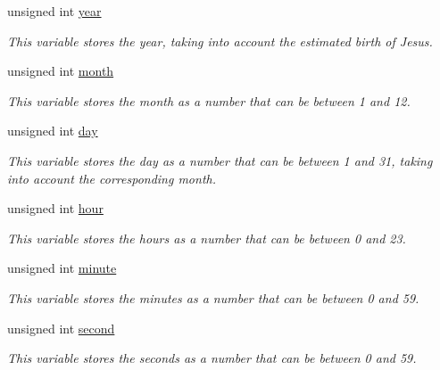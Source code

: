 \begin{DoxyCompactItemize}
\item 
\mbox{\label{structTimeData_a457ba435747cdc51aa3c9213dc75e916}} 
unsigned int \hyperlink{structTimeData_a457ba435747cdc51aa3c9213dc75e916}{year}
\begin{DoxyCompactList}\small\item\em This variable stores the year, taking into account the estimated birth of Jesus. \end{DoxyCompactList}\item 
\mbox{\label{structTimeData_a54ec81ff233394814cb837c41cd3ea0b}} 
unsigned int \hyperlink{structTimeData_a54ec81ff233394814cb837c41cd3ea0b}{month}
\begin{DoxyCompactList}\small\item\em This variable stores the month as a number that can be between 1 and 12. \end{DoxyCompactList}\item 
\mbox{\label{structTimeData_aee725dc9551cd482534c155a168b3d60}} 
unsigned int \hyperlink{structTimeData_aee725dc9551cd482534c155a168b3d60}{day}
\begin{DoxyCompactList}\small\item\em This variable stores the day as a number that can be between 1 and 31, taking into account the corresponding month. \end{DoxyCompactList}\item 
\mbox{\label{structTimeData_a989207381ecc5a4c744bd06bf1091c63}} 
unsigned int \hyperlink{structTimeData_a989207381ecc5a4c744bd06bf1091c63}{hour}
\begin{DoxyCompactList}\small\item\em This variable stores the hours as a number that can be between 0 and 23. \end{DoxyCompactList}\item 
\mbox{\label{structTimeData_ac22938d020a988bebae2493b118b9df2}} 
unsigned int \hyperlink{structTimeData_ac22938d020a988bebae2493b118b9df2}{minute}
\begin{DoxyCompactList}\small\item\em This variable stores the minutes as a number that can be between 0 and 59. \end{DoxyCompactList}\item 
\mbox{\label{structTimeData_ac17cd0725bea21f3be277d2c9a00e3d8}} 
unsigned int \hyperlink{structTimeData_ac17cd0725bea21f3be277d2c9a00e3d8}{second}
\begin{DoxyCompactList}\small\item\em This variable stores the seconds as a number that can be between 0 and 59. \end{DoxyCompactList}\end{DoxyCompactItemize}
